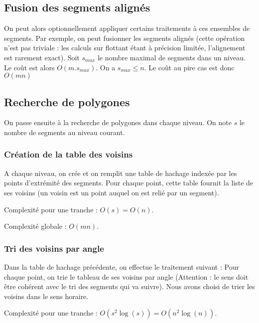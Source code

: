 \documentclass{article}
\begin{document}

\subsection{Fusion des segments alignés}

On peut alors optionnellement appliquer certains traitements à ces ensembles de segments. Par exemple, on peut fusionner les segments alignés (cette opération n'est pas triviale : les calculs sur flottant étant à précision limitée, l'alignement est rarement exact). Soit $s_{max}$ le nombre maximal de segments dans un niveau. Le coût est alors $O(m.s_{max})$. On a $s_{max} \leq n$. Le coût au pire cas est donc $O(mn)$

\subsection{Recherche de polygones}

On passe ensuite à la recherche de polygones dans chaque niveau. On note $s$ le nombre de segments au niveau courant.

\subsubsection{Création de la table des voisins}

A chaque niveau, on crée et on remplit une table de hachage indexée par les points d’extrémité des segments. Pour chaque point, cette table fournit la liste de ses voisins (un voisin est un point auquel on est relié par un segment).

Complexité pour une tranche : $O(s) = O(n)$.

Complexité globale : $O(mn)$.

\subsubsection{Tri des voisins par angle}

Dans la table de hachage précédente, on effectue le traitement suivant :
Pour chaque point, on trie le tableau de ses voisins par angle (Attention : le sens doit être cohérent avec le tri des segments qui va suivre). Nous avons choisi de trier les voisins dans le sens horaire.

Complexité pour une tranche : $O(s^{2}\log(s)) =  O(n^{2}\log(n))$.
\end{document}
